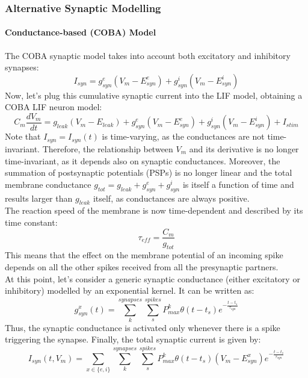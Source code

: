 \subsubsection{Alternative Synaptic Modelling}
\paragraph{Conductance-based (COBA) Model}
The COBA synaptic model takes into account both excitatory and inhibitory synapses:
\begin{equation*}
    I_{syn}=g_{syn}^{e}(V_{m}-E_{syn}^{e})+g_{syn}^{i}(V_{m}-E_{syn}^{i})
\end{equation*}
Now, let's plug this cumulative synaptic current into the LIF model, obtaining a
COBA LIF neuron model:
\begin{equation*}
    C_{m}\frac{dV_{m}}{dt}=g_{leak}(V_{m}-E_{leak})+g_{syn}^{e}(V_{m}-E_{syn}^{e})+g_{syn}^{i}(V_{m}-E_{syn}^{i})+I_{stim}
\end{equation*}
Note that \(I_{syn}=I_{syn}(t)\) is time-varying, as the conductances are not time-invariant. Therefore,
the relationship between \(V_{m}\) and its derivative is no longer time-invariant, as it depends also
on synaptic conductances. Moreover, the summation of postsynaptic potentials (PSPs) is no longer
linear and the total membrane conductance \(g_{tot}=g_{leak}+g_{syn}^{e}+g_{syn}^{i}\) is itself
a function of time and results larger than \(g_{leak}\) itself, as conductances are
always positive.\\
The reaction speed of the membrane is now time-dependent and described
by its time constant:
\begin{equation*}
    \tau_{eff}=\frac{C_{m}}{g_{tot}}
\end{equation*}
This means that the effect on the membrane potential of an incoming spike depends on
all the other spikes received from all the presynaptic partners.\\
At this point, let's consider a generic synaptic conductance (either excitatory or inhibitory)
modelled by an exponential kernel. It can be written as:
\begin{equation*}
    g_{syn}^{x}(t)=\sum_{k}^{synapses}\sum_{s}^{spikes}P_{max}^{k}\theta{(t-t_{s})}e^{-\frac{t-t_{s}}{\tau_{syn}}}
\end{equation*}
Thus, the synaptic conductance is activated only whenever there is a spike triggering
the synapse. Finally, the total synaptic current is given by:
\begin{equation*}
    I_{syn}(t,V_{m})=\sum_{x\in{\{e,i\}}}\sum_{k}^{synapses}\sum_{s}^{spikes}P_{max}^{k}\theta{(t-t_{s})}(V_{m}-E_{syn}^{x})e^{-\frac{t-t_{s}}{\tau_{syn}}}
\end{equation*}
